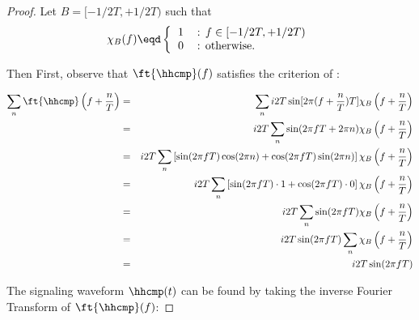 \begin{proof}
Let $B=[-1/2T, +1/2T)$ such that
\[
\chi_B(f) \eqd
\left\{
\begin{tabular}{llll}
   1 & : $f\in [-1/2T, +1/2T)$ \\
   0 & : otherwise.
\end{tabular}
\right.
\]

Then
First, observe that $\ft{\hhcmp}(f)$ satisfies
the criterion of :

\begin{eqnarray*}
   \sum_n \ft{\hhcmp}\left( f + \frac{n}{T} \right)
     &=& \sum_n i2T
         \sin[2\pi (f+\frac{n}{T})T]
         \chi_B\left(f+\frac{n}{T}\right)
   \\&=& i2T  \sum_n
         \sin(2\pi fT + 2\pi n)
         \chi_B\left(f+\frac{n}{T}\right)
   \\&=& i2T  \sum_n \left[
         \sin(2\pi fT)\cos(2\pi n) + \cos(2\pi fT)\sin(2\pi n)
         \right]
         \chi_B\left(f+\frac{n}{T}\right)
   \\&=& i2T  \sum_n \left[
         \sin(2\pi fT)\cdot1 + \cos(2\pi fT)\cdot0
         \right]
         \chi_B\left(f+\frac{n}{T}\right)
   \\&=& i2T  \sum_n \sin(2\pi fT)
         \chi_B\left(f+\frac{n}{T}\right)
   \\&=& i2T \sin(2\pi fT) \sum_n
         \chi_B\left(f+\frac{n}{T}\right)
   \\&=& i2T \sin(2\pi fT)
\end{eqnarray*}

The signaling waveform $\hhcmp(t)$ can be found by taking
the inverse Fourier Transform of $\ft{\hhcmp}(f)$:


\end{proof}
